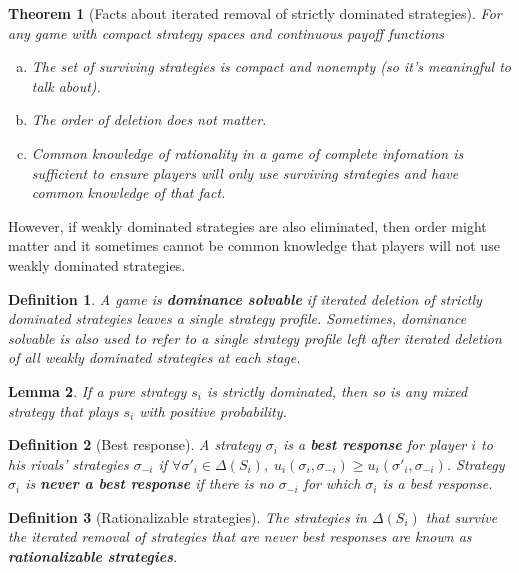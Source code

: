 \documentclass[letter, 10pt]{article}
\theoremstyle{basic}
\newtheorem{definition}{Definition}[section]
\newtheorem{theorem}{Theorem}[section]
\newtheorem{lemma}[theorem]{Lemma}
\begin{document}
\begin{spacing}{1.1}
\begin{theorem}[Facts about iterated removal of strictly dominated
  strategies]
  For any game with compact strategy spaces and continuous payoff functions
  \begin{enumerate}[a)]\leftskip = 1em
  \item The set of surviving strategies is compact and
    nonempty (so it's meaningful to talk about).
  \item The order of deletion does not matter.
  \item Common knowledge of rationality in a game of complete infomation is
    sufficient to ensure players will only use surviving strategies and
    have common knowledge of that fact.
  \end{enumerate}
\end{theorem}

However, if weakly dominated strategies are also eliminated, then
order might matter and it sometimes cannot be common knowledge that players
will not use weakly dominated strategies.

\begin{definition}
  A game is \textbf{dominance solvable} if iterated deletion of strictly
  dominated strategies leaves a single strategy profile. Sometimes,
  dominance solvable is also used to refer to a single strategy profile
  left after iterated deletion of all weakly dominated strategies at each
  stage.
\end{definition}

\begin{lemma}
  If a pure strategy $s_i$ is strictly dominated, then so is any mixed
  strategy that plays $s_i$ with positive probability.
\end{lemma}

\begin{definition}[Best response]
  A strategy $\sigma_i$ is a \textbf{best response} for
  player $i$ to his rivals' strategies $\sigma_{-i}$ if $\forall \sigma'_i
  \in \Delta(S_i),\; u_i(\sigma_i, \sigma_{-i}) \geq u_i(\sigma'_i,
  \sigma_{-i})$. Strategy $\sigma_i$ is \textbf{never a best response} if
  there is no $\sigma_{-i}$ for which $\sigma_i$ is a best response.
\end{definition}

\begin{definition}[Rationalizable strategies]
  The strategies in $\Delta(S_i)$ that survive
  the iterated removal of strategies that are never best responses are
  known as \textbf{rationalizable strategies}.
\end{definition}


\end{spacing}
\end{document}
